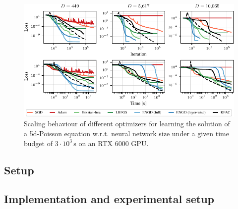 \begin{figure}[tb]
  \centering
  \includegraphics{../kfac_pinns_exp/exp18_groupplot_poisson5d/loss.pdf}
  \caption{Scaling behaviour of different optimizers for learning the solution of a 5d-Poisson equation w.r.t.
    neural network size under a given time budget of $3\cdot 10^3\,\text{s}$ on an RTX 6000 GPU.}
  \label{fig:pedagogical-example}
\end{figure}

\subsection{Setup}
\subsection{Implementation and experimental setup}


